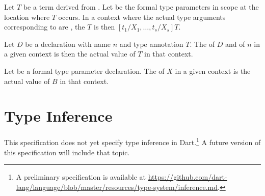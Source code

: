 \documentclass[makeidx]{article}
\begin{document}
%

\LMHash{}%
Let $T$ be a term derived from .
Let  be the formal type parameters in scope
at the location where $T$ occurs.
In a context where the actual type arguments corresponding to
 are ,
the  $T$ is then
$[t_1/X_1, \ldots, t_s/X_s]T$.

\LMHash{}%
Let $D$ be a declaration with name $n$ and type annotation $T$.
The  of $D$ and of $n$ in a given context is
then the actual value of $T$ in that context.


\LMHash{}%
Let  be a formal type parameter declaration.
The  of $X$ in a given context is
the actual value of $B$ in that context.



\section{Type Inference}

\LMHash{}%
This specification does not yet specify type inference in Dart.\!\footnote{%
A preliminary specification is available at
\url{https://github.com/dart-lang/language/blob/master/resources/type-system/inference.md}.%
}
A future version of this specification will include that topic.
\end{document}
